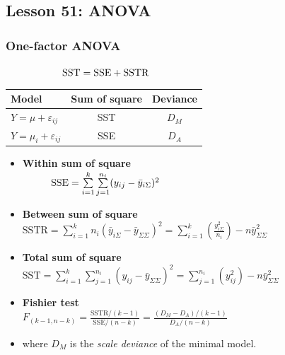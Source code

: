 \documentclass[10pt, french]{article}
\begin{document}
\begin{multicols*}{3}
\section*{Lesson 51: ANOVA}
\subsubsection*{One-factor ANOVA}
$\hspace*{2cm} \mathrm{SST} = \mathrm{SSE} + \mathrm{SSTR}$
   \begin{center}
      \begin{tabular}{lcc}
        \hline
        Model & Sum of square & Deviance \\
        \hline
         $Y = \mu + \varepsilon_{ij}$ & SST & $D_M$ \\
         $Y = \mu_i + \varepsilon_{ij}$ & SSE & $D_A$ \\
         \hline
      \end{tabular} 
   \end{center} 
\begin{itemize}[align=left,leftmargin=*]
   \item  \textbf{Within sum of square} \\
   $\hspace*{1cm} \mathrm{SSE} = \sum\limits_{i=1}^k \sum\limits_{j=1}^{n_i} (y_{ij} - \bar{y}_{i\Sigma})^2$
   \item \textbf{Between sum of square} \\
   $\mathrm{SSTR} = \sum\limits_{i=1}^k n_i (\bar{y}_{i\Sigma} - \bar{y}_{\Sigma\Sigma})^2 = \sum\limits_{i=1}^k \left(\frac{y^2_{i\Sigma}}{n_i}\right)  - n\bar{y}_{\Sigma\Sigma}^2$
   \item \textbf{Total sum of square} \\
   $\mathrm{SST} = \sum\limits_{i=1}^k \sum\limits_{j=1}^{n_i} (y_{ij} - \bar{y}_{\Sigma\Sigma})^2 = \sum\limits_{j=1}^{n_i} (y_{ij}^2) - n\bar{y}_{\Sigma\Sigma}^2$ \\
   \item \textbf{Fishier test} \\
   $F_{(k-1, n-k)} = \frac{\mathrm{SSTR}/(k-1)}{\mathrm{SSE}/(n-k)} = \frac{(D_M - D_A)/(k-1)}{D_A/(n-k)}$
   \item[] where $D_M$ is the \emph{scale deviance} of the minimal model.
\end{itemize}

\end{multicols*}
\end{document}
